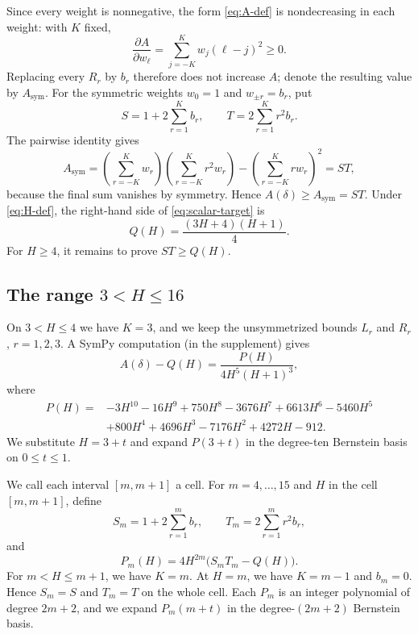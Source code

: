 \documentclass[ECP,preprint]{ejpecp}
\begin{document}
Since every weight is nonnegative, the form \eqref{eq:A-def} is
nondecreasing in each weight: with $K$ fixed,
\[
  \frac{\partial A}{\partial w_\ell}
  =\sum_{j=-K}^K w_j(\ell-j)^2\geq0.
\]
Replacing every $R_r$ by $b_r$ therefore does not increase $A$; denote the
resulting value by $A_{\mathrm{sym}}$. For the symmetric weights $w_0=1$ and
$w_{\pm r}=b_r$, put
\begin{equation}\label{eq:S-T}
  S=1+2\sum_{r=1}^K b_r,
  \qquad
  T=2\sum_{r=1}^K r^2b_r.
\end{equation}
The pairwise identity gives
\[
  A_{\mathrm{sym}}
  =\left(\sum_{r=-K}^K w_r\right)
   \left(\sum_{r=-K}^K r^2w_r\right)
   -\left(\sum_{r=-K}^K rw_r\right)^2
  =ST,
\]
because the final sum vanishes by symmetry. Hence
$A(\delta)\geq A_{\mathrm{sym}}=ST$. Under \eqref{eq:H-def}, the right-hand
side of \eqref{eq:scalar-target} is
\begin{equation}\label{eq:Q-def}
  Q(H)=\frac{(3H+4)(H+1)}4.
\end{equation}
For $H\geq4$, it remains to prove $ST\geq Q(H)$.

\subsection{The range \texorpdfstring{$3<H\leq16$}{3 < H <= 16}}
\label{sec:compact}

On $3<H\leq4$ we have $K=3$, and we keep the unsymmetrized bounds $L_r$ and
$R_r$, $r=1,2,3$. A SymPy computation (in the supplement) gives
\begin{equation}\label{eq:asymmetric-P}
  A(\delta)-Q(H)=\frac{P(H)}{4H^5(H+1)^3},
\end{equation}
where
\begin{align*}
  P(H)={}&-3H^{10}-16H^9+750H^8-3676H^7+6613H^6
  -5460H^5\\
  &+800H^4+4696H^3-7176H^2+4272H-912.
\end{align*}
We substitute $H=3+t$ and expand $P(3+t)$ in the degree-ten Bernstein basis
on $0\leq t\leq1$.

We call each interval $[m,m+1]$ a cell. For $m=4,\ldots,15$ and $H$ in the
cell $[m,m+1]$, define
\begin{equation}\label{eq:compact-ST}
  S_m=1+2\sum_{r=1}^m b_r,
  \qquad
  T_m=2\sum_{r=1}^m r^2b_r,
\end{equation}
and
\begin{equation}\label{eq:compact-P}
  P_m(H)=4H^{2m}\bigl(S_mT_m-Q(H)\bigr).
\end{equation}
For $m<H\leq m+1$, we have $K=m$. At $H=m$, we have $K=m-1$ and $b_m=0$.
Hence $S_m=S$ and $T_m=T$ on the whole cell. Each $P_m$ is an integer
polynomial of degree $2m+2$, and we expand $P_m(m+t)$ in the
degree-$(2m+2)$ Bernstein basis.
\end{document}
